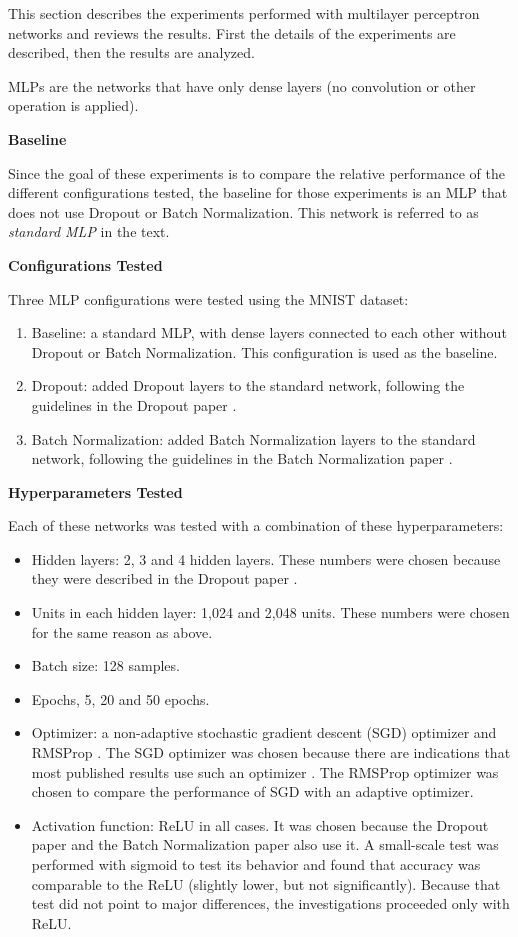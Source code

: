 \documentclass[../CAP6619_term_project_cgarbin.tex]{subfiles}
\begin{document}
This section describes the experiments performed with multilayer perceptron networks and reviews the results. First the details of the experiments are described, then the results are analyzed.

MLPs are the networks that have only dense layers (no convolution or other operation is applied).

\medskip
\textbf{Baseline}

Since the goal of these experiments is to compare the relative performance of the different configurations tested, the baseline for those experiments is an MLP that does not use Dropout or Batch Normalization. This network is referred to as \textit{standard MLP} in the text.

\medskip
\textbf{Configurations Tested}

Three MLP configurations were tested using the MNIST dataset:

\begin{enumerate}
\item Baseline: a standard MLP, with dense layers connected to each other without Dropout or Batch Normalization. This configuration is used as the baseline.
\item Dropout: added Dropout layers to the standard network, following the guidelines in the Dropout paper \cite{Srivastava2014}.
\item Batch Normalization: added Batch Normalization layers to the standard network, following the guidelines in the Batch Normalization paper \cite{Ioffe2015}.
\end{enumerate}

\medskip
\textbf{Hyperparameters Tested}

Each of these networks was tested with a combination of these hyperparameters:

\begin{itemize}
\item Hidden layers: 2, 3 and 4 hidden layers. These numbers were chosen because they were described in the Dropout paper \cite{Srivastava2014}.
\item Units in each hidden layer: 1,024 and 2,048 units. These numbers were chosen for the same reason as above.
\item Batch size: 128 samples.
\item Epochs, 5, 20 and 50 epochs.
\item Optimizer: a non-adaptive stochastic gradient descent (SGD) optimizer and RMSProp \cite{Tieleman2012}. The SGD optimizer was chosen because there are indications that most published results use such an optimizer \cite{Ruder2016}. The RMSProp optimizer was chosen to compare the performance of SGD with an adaptive optimizer.
\item Activation function: ReLU \cite{Nair2010} in all cases. It was chosen because the Dropout paper \cite{Srivastava2014} and the Batch Normalization paper \cite{Ioffe2015} also use it. A small-scale test was performed with sigmoid to test its behavior and found that accuracy was comparable to the ReLU (slightly lower, but not significantly). Because that test did not point to major differences, the investigations proceeded only with ReLU.
\end{itemize}
\end{document}
